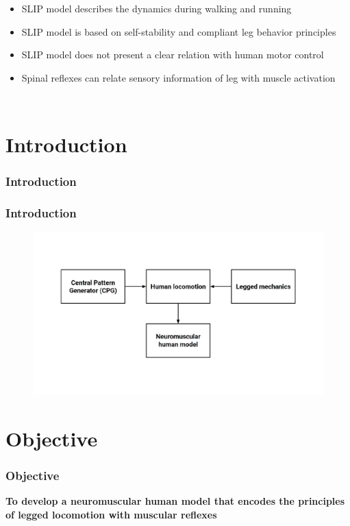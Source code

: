 \documentclass[10pt]{beamer}
\begin{document}
\begin{frame}
\begin{columns}
		\begin{itemize}
			\item SLIP model describes the dynamics during walking and running\footnotemark[1] \\[1em]
			\item SLIP model is based on self-stability and compliant leg behavior principles\footnotemark[2] \\[1em]
			\item SLIP model does not present a clear relation with human motor control\footnotemark[2] \\[1em]	
			\item Spinal reflexes can relate sensory information of leg with muscle activation\footnotemark[2]
		\end{itemize}
	\end{columns}
\end{frame}

\section{Introduction}
	\frametitle{Introduction}
	\begin{frame}	
		\frametitle{Introduction}	
		\begin{figure}
			\centering
			\includegraphics[height=.65\textheight]{images/introduction.pdf}
		\end{figure}
\end{frame}

\section{Objective}	
\begin{frame}
	\frametitle{Objective}
	\centering
	\LARGE
	\bf
	To develop a neuromuscular human model that encodes the principles of legged locomotion with muscular reflexes
\end{frame}
\end{document}
